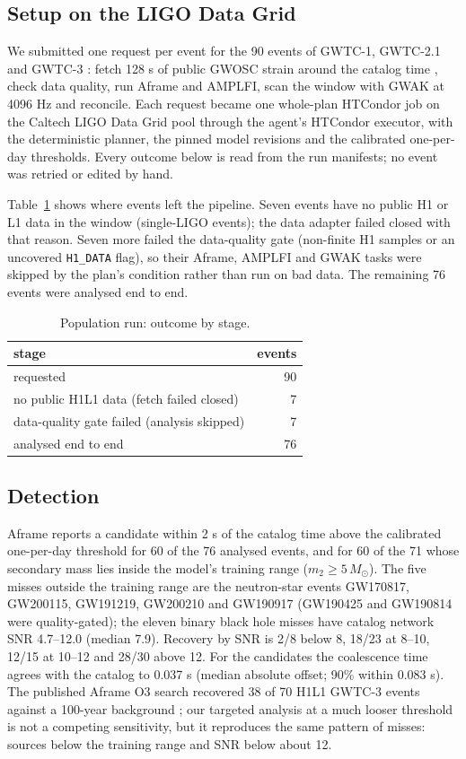 \documentclass[twocolumn]{aastex631}
\begin{document}
\subsection{Setup on the LIGO Data Grid}
We submitted one request per event for the 90 events of GWTC-1, GWTC-2.1
and GWTC-3 \citep{gwtc21,gwtc3}: fetch 128 s of public GWOSC strain around
the catalog time \citep{gwosc}, check data quality, run Aframe and AMPLFI,
scan the window with GWAK at 4096 Hz and reconcile. Each request became one
whole-plan HTCondor job on the Caltech LIGO Data Grid pool through the
agent's HTCondor executor, with the deterministic planner, the pinned model
revisions and the calibrated one-per-day thresholds. Every outcome below is
read from the run manifests; no event was retried or edited by hand.

Table~\ref{tab:stages} shows where events left the pipeline. Seven events
have no public H1 or L1 data in the window (single-LIGO events); the data
adapter failed closed with that reason. Seven more failed the data-quality
gate (non-finite H1 samples or an uncovered \texttt{H1\_DATA} flag), so
their Aframe, AMPLFI and GWAK tasks were skipped by the plan's condition
rather than run on bad data. The remaining 76 events were analysed end to
end.

\begin{table}
\centering
\caption{Population run: outcome by stage.}
\label{tab:stages}
\begin{tabular}{lr}
\toprule
stage & events \\
\midrule
requested & 90 \\
no public H1L1 data (fetch failed closed) & 7 \\
data-quality gate failed (analysis skipped) & 7 \\
analysed end to end & 76 \\
\bottomrule
\end{tabular}
\end{table}

\subsection{Detection}
Aframe reports a candidate within 2 s of the catalog time above the
calibrated one-per-day threshold for 60 of the 76 analysed events, and for
60 of the 71 whose secondary mass lies inside the model's training range
($m_2 \geq 5\,M_\odot$). The five misses outside the training range are the
neutron-star events GW170817, GW200115, GW191219, GW200210 and GW190917
(GW190425 and GW190814 were quality-gated); the eleven binary black hole misses have
catalog network SNR 4.7--12.0 (median 7.9). Recovery by SNR is 2/8 below
8, 18/23 at 8--10, 12/15 at 10--12 and 28/30 above 12. For the candidates
the coalescence time agrees with the catalog to 0.037 s (median absolute
offset; 90\% within 0.083 s). The published Aframe O3 search recovered 38
of 70 H1L1 GWTC-3 events against a 100-year background \citep{marx2025};
our targeted analysis at a much looser threshold is not a competing
sensitivity, but it reproduces the same pattern of misses: sources below
the training range and SNR below about 12.
\end{document}
